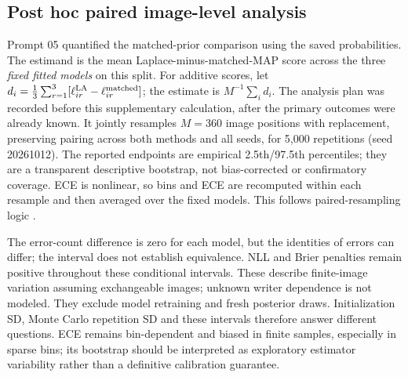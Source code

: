 \documentclass[10pt,a4paper]{article}
\begin{document}
\subsection{Post hoc paired image-level analysis}
Prompt 05 quantified the matched-prior comparison using the saved probabilities.
The estimand is the mean Laplace-minus-matched-MAP score across the three
\emph{fixed fitted models} on this split. For additive scores, let
$d_i=\tfrac13\sum_{r=1}^3[\ell_{ir}^{\rm LA}-\ell_{ir}^{\rm matched}]$;
the estimate is $M^{-1}\sum_i d_i$. The analysis plan was recorded before this
supplementary calculation, after the primary outcomes were already known.
It jointly resamples $M=360$ image positions with replacement, preserving pairing
across both methods and all seeds, for 5,000 repetitions (seed 20261012).
The reported endpoints are empirical 2.5th/97.5th percentiles; they are a
transparent descriptive bootstrap, not bias-corrected or confirmatory coverage.
ECE is nonlinear, so bins and ECE are recomputed within each resample and then
averaged over the fixed models. This follows paired-resampling logic \cite{bootstrap}.
\begin{table}[H]\centering
\caption{Exploratory Laplace-minus-matched-MAP differences and conditional 95\%
paired image-bootstrap percentile intervals. Scores use the same 360 images;
error uses percentage points. Positive proper-score differences favor matched MAP.}
\label{tab:paired}\end{table}
The error-count difference is zero for each model, but the identities of errors
can differ; the interval does not establish equivalence. NLL and Brier penalties
remain positive throughout these conditional intervals. These describe finite-image
variation assuming exchangeable images; unknown writer dependence is not modeled.
They exclude model retraining and fresh posterior draws. Initialization SD,
Monte Carlo repetition SD and these intervals therefore answer different questions.
ECE remains bin-dependent and biased in finite samples, especially in sparse bins;
its bootstrap should be interpreted as exploratory estimator variability rather
than a definitive calibration guarantee.
\end{document}
